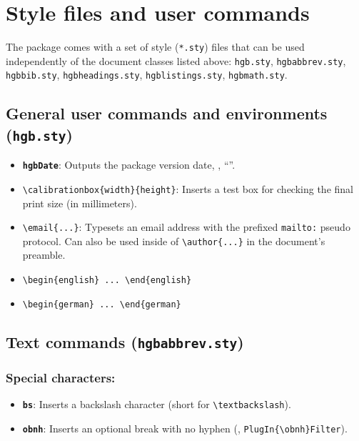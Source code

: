 \documentclass[english]{hgbarticle}
\begin{document}
\section{Style files and user commands}

The package comes with a set of style (\texttt{*.sty}) files that can be used
independently of the document classes listed above:
\texttt{hgb.sty},
\texttt{hgbabbrev.sty},
\texttt{hgbbib.sty},
\texttt{hgbheadings.sty},
\texttt{hgblistings.sty},
\texttt{hgbmath.sty}.


\subsection{General user commands and environments (\texttt{hgb.sty})}


\begin{itemize}
\item \textbf{\texttt{{\bs}hgbDate}}: Outputs the package version date, 
		\eg, ``\texttt{\hgbDate}''.
\item \verb!\calibrationbox{width}{height}!: Inserts a test box for checking the final print size 
(in millimeters).
\item \verb!\email{...}!: Typesets an email address with the prefixed \texttt{mailto:} pseudo protocol.
Can also be used inside of \verb!\author{...}! in the document's preamble.
\item \verb!\begin{english} ... \end{english}!
\item \verb!\begin{german} ... \end{german}!
\end{itemize}



\subsection{Text commands (\texttt{hgbabbrev.sty})}

\subsubsection*{Special characters:}

\begin{itemize}
\item \textbf{\texttt{{\bs}bs}}: Inserts a backslash character (short for \verb!\textbackslash!).
\item \textbf{\texttt{{\bs}obnh}}: Inserts an optional break with no hyphen (\eg, \verb!PlugIn{\obnh}Filter!).
\end{itemize}
\end{document}
